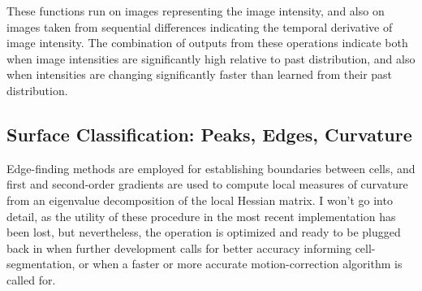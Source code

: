 \documentclass[../main.tex]{subfiles}
\begin{document}


These functions run on images representing the image intensity, and also on images taken from sequential differences indicating the temporal derivative of image intensity.
The combination of outputs from these operations indicate both when image intensities are significantly high relative to past distribution, and also when intensities are changing significantly faster than learned from their past distribution.

\subsection{
	Surface Classification: Peaks, Edges, Curvature}\label{surface-classification-peaks-edges-curvature}

Edge-finding methods are employed for establishing boundaries between cells, and first and second-order gradients are used to compute local measures of curvature from an eigenvalue decomposition of the local Hessian matrix.
I won't go into detail, as the utility of these procedure in the most recent implementation has been lost, but nevertheless, the operation is optimized and ready to be plugged back in when further development calls for better accuracy informing cell-segmentation, or when a faster or more accurate motion-correction algorithm is called for.
\end{document}
